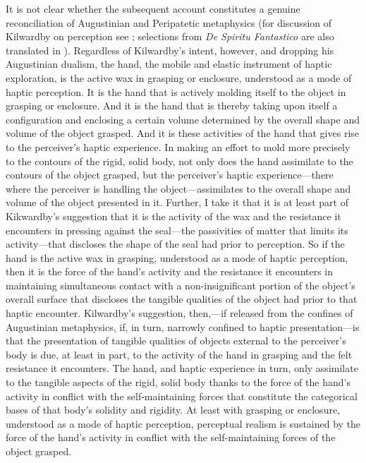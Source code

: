 It is not clear whether the subsequent account constitutes a genuine reconciliation of Augustinian and Peripatetic metaphysics (for discussion of Kilwardby on perception see \citealt{Silva:2008yg,Silva:2010zh}; selections from \emph{De Spiritu Fantastico} are also translated in \citealt{Knuuttila:2014rc}). Regardless of Kilwardby's intent, however, and dropping his Augustinian dualism, the hand, the mobile and elastic instrument of haptic exploration, is the active wax in grasping or enclosure, understood as a mode of haptic perception. It is the hand that is actively molding itself to the object in grasping or enclosure. And it is the hand that is thereby taking upon itself a configuration and enclosing a certain volume determined by the overall shape and volume of the object grasped. And it is these activities of the hand that gives rise to the perceiver's haptic experience. In making an effort to mold more precisely to the contours of the rigid, solid body, not only does the hand assimilate to the contours of the object grasped, but the perceiver's haptic experience---there where the perceiver is handling the object---assimilates to the overall shape and volume of the object presented in it. Further, I take it that it is at least part of Kikwardby's suggestion that it is the activity of the wax and the resistance it encounters in pressing against the seal---the passivities of matter that limits its activity---that discloses the shape of the seal had prior to perception. So if the hand is the active wax in grasping, understood as a mode of haptic perception, then it is the force of the hand's activity and the resistance it encounters in maintaining simultaneous contact with a non-insignificant portion of the object's overall surface that discloses the tangible qualities of the object had prior to that haptic encounter. Kilwardby's suggestion, then,---if released from the confines of Augustinian metaphysics, if, in turn, narrowly confined to haptic presentation---is that the presentation of tangible qualities of objects external to the perceiver's body is due, at least in part, to the activity of the hand in grasping and the felt resistance it encounters. The hand, and haptic experience in turn, only assimilate to the tangible aspects of the rigid, solid body thanks to the force of the hand's activity in conflict with the self-maintaining forces that constitute the categorical bases of that body's solidity and rigidity. At least with grasping or enclosure, understood as a mode of haptic perception, perceptual realism is sustained by the force of the hand’s activity in conflict with the self-maintaining forces of the object grasped.

